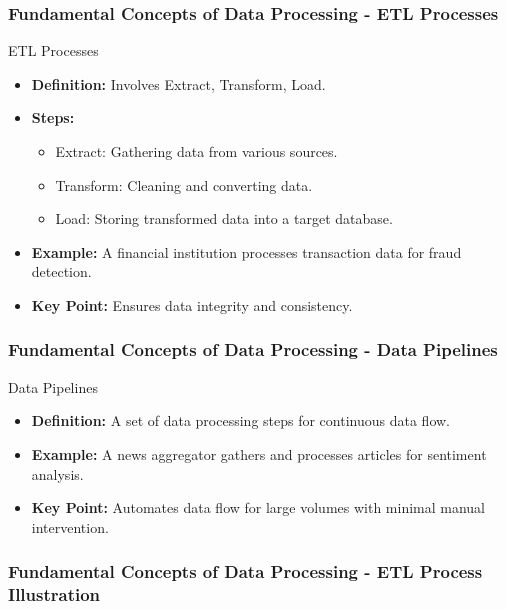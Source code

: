 \documentclass{beamer}
\begin{document}
\begin{frame}[fragile]
    \frametitle{Fundamental Concepts of Data Processing - ETL Processes}
    \begin{block}{ETL Processes}
        \begin{itemize}
            \item \textbf{Definition:} Involves Extract, Transform, Load.
            \item \textbf{Steps:}
            \begin{itemize}
                \item Extract: Gathering data from various sources.
                \item Transform: Cleaning and converting data.
                \item Load: Storing transformed data into a target database.
            \end{itemize}
            \item \textbf{Example:} A financial institution processes transaction data for fraud detection.
            \item \textbf{Key Point:} Ensures data integrity and consistency.
        \end{itemize}
    \end{block}
\end{frame}

\begin{frame}[fragile]
    \frametitle{Fundamental Concepts of Data Processing - Data Pipelines}
    \begin{block}{Data Pipelines}
        \begin{itemize}
            \item \textbf{Definition:} A set of data processing steps for continuous data flow.
            \item \textbf{Example:} A news aggregator gathers and processes articles for sentiment analysis.
            \item \textbf{Key Point:} Automates data flow for large volumes with minimal manual intervention.
        \end{itemize}
    \end{block}
\end{frame}

\begin{frame}[fragile]
    \frametitle{Fundamental Concepts of Data Processing - ETL Process Illustration}
\end{frame}
\end{document}
